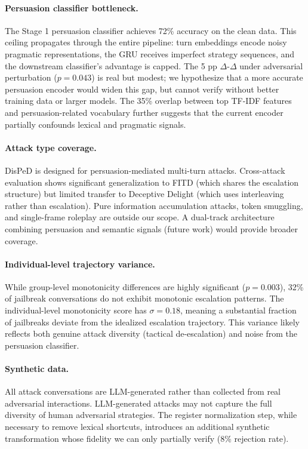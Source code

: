 \documentclass[11pt,a4paper]{article}
\begin{document}
\paragraph{Persuasion classifier bottleneck.}
The Stage 1 persuasion classifier achieves 72\% accuracy on the clean data.
This ceiling propagates through the entire pipeline: turn embeddings encode noisy pragmatic representations, the GRU receives imperfect strategy sequences, and the downstream classifier's advantage is capped.
The 5 pp $\Delta$-$\Delta$ under adversarial perturbation ($p{=}0.043$) is real but modest; we hypothesize that a more accurate persuasion encoder would widen this gap, but cannot verify without better training data or larger models.
The 35\% overlap between top TF-IDF features and persuasion-related vocabulary further suggests that the current encoder partially confounds lexical and pragmatic signals.

\paragraph{Attack type coverage.}
DisPeD is designed for persuasion-mediated multi-turn attacks.
Cross-attack evaluation shows significant generalization to FITD (which shares the escalation structure) but limited transfer to Deceptive Delight (which uses interleaving rather than escalation).
Pure information accumulation attacks, token smuggling, and single-frame roleplay are outside our scope.
A dual-track architecture combining persuasion and semantic signals (future work) would provide broader coverage.

\paragraph{Individual-level trajectory variance.}
While group-level monotonicity differences are highly significant ($p{=}0.003$), 32\% of jailbreak conversations do not exhibit monotonic escalation patterns.
The individual-level monotonicity score has $\sigma{=}0.18$, meaning a substantial fraction of jailbreaks deviate from the idealized escalation trajectory.
This variance likely reflects both genuine attack diversity (tactical de-escalation) and noise from the persuasion classifier.

\paragraph{Synthetic data.}
All attack conversations are LLM-generated rather than collected from real adversarial interactions.
LLM-generated attacks may not capture the full diversity of human adversarial strategies.
The register normalization step, while necessary to remove lexical shortcuts, introduces an additional synthetic transformation whose fidelity we can only partially verify (8\% rejection rate).
\end{document}
